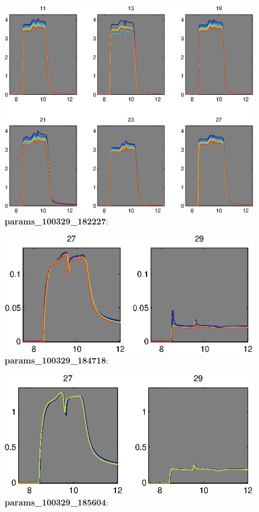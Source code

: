 \documentclass[a4paper]{report}
\begin{document}
\begin{figure}
\centering
\includegraphics[width=5in]{params_100329_182227.eps}
\caption{\textbf{params\_100329\_182227}:}
\end{figure}


\begin{figure}
\centering
\includegraphics[width=5in]{params_100329_184718.eps}
\caption{\textbf{params\_100329\_184718}:}
\end{figure}


\begin{figure}
\centering
\includegraphics[width=5in]{params_100329_185604.eps}
\caption{\textbf{params\_100329\_185604}:}
\end{figure}
\end{document}
